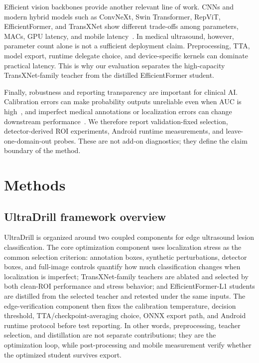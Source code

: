 \documentclass[preprint,12pt]{elsarticle}
\begin{document}
Efficient vision backbones provide another relevant line of work. CNNs and modern hybrid models such as ConvNeXt, Swin Transformer, RepViT, EfficientFormer, and TransXNet show different trade-offs among parameters, MACs, GPU latency, and mobile latency~\cite{liu2021swin,liu2022convnext,repvit,li2022efficientformer,transxnet}. In medical ultrasound, however, parameter count alone is not a sufficient deployment claim. Preprocessing, TTA, model export, runtime delegate choice, and device-specific kernels can dominate practical latency. This is why our evaluation separates the high-capacity TransXNet-family teacher from the distilled EfficientFormer student.

Finally, robustness and reporting transparency are important for clinical AI. Calibration errors can make probability outputs unreliable even when AUC is high~\cite{guo2017calibration}, and imperfect medical annotations or localization errors can change downstream performance~\cite{tajbakhsh2020embracing}. We therefore report validation-fixed selection, detector-derived ROI experiments, Android runtime measurements, and leave-one-domain-out probes. These are not add-on diagnostics; they define the claim boundary of the method.

\section{Methods}
\label{sec:methods}

\subsection{UltraDrill framework overview}
\label{sec:ultradrill}

UltraDrill is organized around two coupled components for edge ultrasound lesion classification. The core optimization component uses localization stress as the common selection criterion: annotation boxes, synthetic perturbations, detector boxes, and full-image controls quantify how much classification changes when localization is imperfect; TransXNet-family teachers are ablated and selected by both clean-ROI performance and stress behavior; and EfficientFormer-L1 students are distilled from the selected teacher and retested under the same inputs. The edge-verification component then fixes the calibration temperature, decision threshold, TTA/checkpoint-averaging choice, ONNX export path, and Android runtime protocol before test reporting. In other words, preprocessing, teacher selection, and distillation are not separate contributions; they are the optimization loop, while post-processing and mobile measurement verify whether the optimized student survives export.
\end{document}
